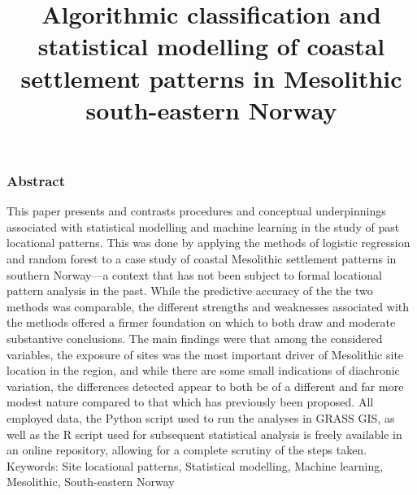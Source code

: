 \documentclass[12pt, a4paper]{article}
\title{Algorithmic classification and statistical modelling of coastal settlement patterns in Mesolithic south-eastern Norway}
\date{}
\author{}
\begin{document}
\maketitle
\subsubsection*{Abstract}
This paper presents and contrasts procedures and conceptual underpinnings associated with statistical modelling and machine learning in the study of past locational patterns. This was done by applying the methods of logistic regression and random forest to a case study of coastal Mesolithic settlement patterns in southern Norway---a context that has not been subject to formal locational pattern analysis in the past. While the predictive accuracy of the the two methods was comparable, the different strengths and weaknesses associated with the methods offered a firmer foundation on which to both draw and moderate substantive conclusions. The main findings were that among the considered variables, the exposure of sites was the most important driver of Mesolithic site location in the region, and while there are some small indications of diachronic variation, the differences detected appear to both be of a different and far more modest nature compared to that which has previously been proposed. All employed data, the Python script used to run the analyses in GRASS GIS, as well as the R script used for subsequent statistical analysis is freely available in an online repository, allowing for a complete scrutiny of the steps taken. \\

Keywords: Site locational patterns, Statistical modelling, Machine learning, Mesolithic, South-eastern Norway
\end{document}
